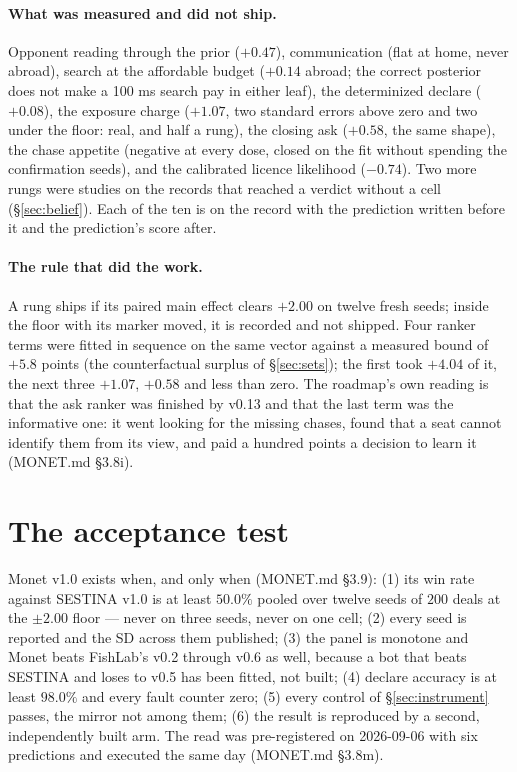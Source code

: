 \documentclass[11pt]{article}
\newcommand{\monet}{MONET.md}
\begin{document}
\paragraph{What was measured and did not ship.} Opponent reading through the prior ($+0.47$),
communication (flat at home, never abroad), search at the affordable budget ($+0.14$ abroad; the
correct posterior does not make a 100 ms search pay in either leaf), the determinized declare
($+0.08$), the exposure charge ($+1.07$, two standard errors above zero and two under the floor:
real, and half a rung), the closing ask ($+0.58$, the same shape), the chase appetite (negative at
every dose, closed on the fit without spending the confirmation seeds), and the calibrated licence
likelihood ($-0.74$). Two more rungs were studies on the records that reached a verdict without a
cell (\S\ref{sec:belief}). Each of the ten is on the record with the prediction written before it
and the prediction's score after.

\paragraph{The rule that did the work.} A rung ships if its paired main effect clears $+2.00$ on
twelve fresh seeds; inside the floor with its marker moved, it is recorded and not shipped. Four
ranker terms were fitted in sequence on the same vector against a measured bound of $+5.8$ points
(the counterfactual surplus of \S\ref{sec:sets}); the first took $+4.04$ of it, the next three
$+1.07$, $+0.58$ and less than zero. The roadmap's own reading is that the ask ranker was finished
by v0.13 and that the last term was the informative one: it went looking for the missing chases,
found that a seat cannot identify them from its view, and paid a hundred points a decision to learn
it (\monet{} \S3.8i).

\section{The acceptance test}
\label{sec:table}

Monet v1.0 exists when, and only when (\monet{} \S3.9): (1) its win rate against SESTINA v1.0 is at
least $50.0\%$ pooled over twelve seeds of $200$ deals at the $\pm 2.00$ floor --- never on three
seeds, never on one cell; (2) every seed is reported and the SD across them published; (3) the panel
is monotone and Monet beats FishLab's v0.2 through v0.6 as well, because a bot that beats SESTINA and
loses to v0.5 has been fitted, not built; (4) declare accuracy is at least $98.0\%$ and every fault
counter zero; (5) every control of \S\ref{sec:instrument} passes, the mirror not among them; (6) the
result is reproduced by a second, independently built arm. The read was pre-registered on
2026-09-06 with six predictions and executed the same day (\monet{} \S3.8m).
\end{document}
